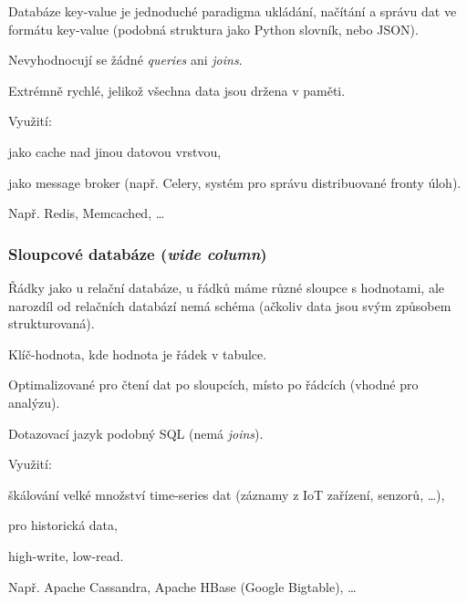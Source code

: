 \begin{compactitem}
    \item Databáze key-value je jednoduché paradigma ukládání, načítání a správu dat ve formátu key-value (podobná struktura jako Python slovník, nebo JSON).
    \item Nevyhodnocují se žádné \textit{queries} ani \textit{joins}.
    \item Extrémně rychlé, jelikož všechna data jsou držena v paměti.
    \item Využití: \begin{compactitem}
        \item jako cache nad jinou datovou vrstvou,
        \item jako message broker (např. Celery, systém pro správu distribuované fronty úloh).
    \end{compactitem}
    \item Např. Redis, Memcached, \dots
\end{compactitem}

\subsubsection*{Sloupcové databáze (\textit{wide column})}

\begin{compactitem}
    \item Řádky jako u relační databáze, u řádků máme různé sloupce s hodnotami, ale narozdíl od relačních databází nemá schéma (ačkoliv data jsou svým způsobem strukturovaná).
    \item Klíč-hodnota, kde hodnota je řádek v tabulce.
    \item Optimalizované pro čtení dat po sloupcích, místo po řádcích (vhodné pro analýzu).
    \item Dotazovací jazyk podobný SQL (nemá \textit{joins}).
    \item Využití: \begin{compactitem}
        \item škálování velké množství time-series dat (záznamy z IoT zařízení, senzorů, \dots),
        \item pro historická data,
        \item high-write, low-read.
    \end{compactitem}
    \item Např. Apache Cassandra, Apache HBase (Google Bigtable), \dots
\end{compactitem}

